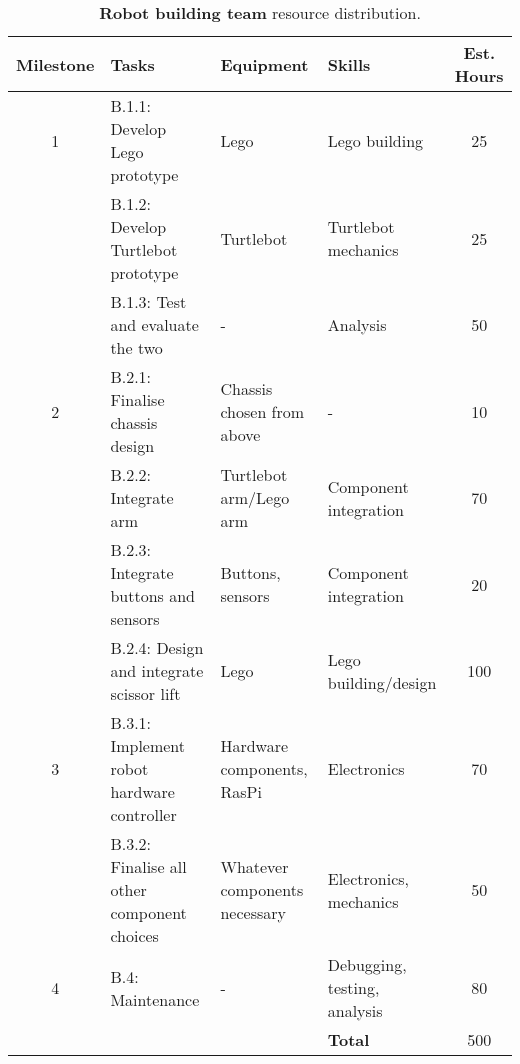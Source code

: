 \documentclass{article}
\begin{document}
\begin{table*}[]
  \begin{center}
  \begin{small}
  \begin{tabular}{|c|l|l|l|c|}
    \hline
    {\bf Milestone} & {\bf Tasks} & {\bf Equipment} & {\bf Skills} & {\bf Est. Hours} \\ \hline
    1               & B.1.1: Develop Lego prototype & Lego & Lego building & 25\\ \cline{2-5}
                    & B.1.2: Develop Turtlebot prototype & Turtlebot & Turtlebot mechanics & 25\\ \cline{2-5}
                    & B.1.3: Test and evaluate the two & - & Analysis & 50\\ \hline
    2               & B.2.1: Finalise chassis design & Chassis chosen from above & - & 10\\ \cline{2-5}
                    & B.2.2: Integrate arm & Turtlebot arm/Lego arm & Component integration & 70\\ \cline{2-5}
                    & B.2.3: Integrate buttons and sensors & Buttons, sensors & Component integration & 20\\ \cline{2-5}
                    & B.2.4: Design and integrate scissor lift & Lego & Lego building/design & 100\\ \hline
    3               & B.3.1: Implement robot hardware controller & Hardware components, RasPi & Electronics & 70\\ \cline{2-5}
                    & B.3.2: Finalise all other component choices & Whatever components necessary & Electronics, mechanics & 50\\ \hline
    4               & B.4: Maintenance & - & Debugging, testing, analysis & 80\\ \hline
                    &                           &  & {\bf Total} & 500 \\ \hline
  \end{tabular}
  \end{small}
  \caption{{\bf Robot building team} resource distribution.}
  \label{tab:rb-rd}
  \end{center}
\end{table*}
\end{document}

